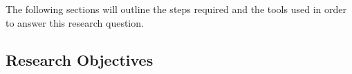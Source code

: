\documentclass[a4paper]{article}
\newcommand*{\0}{$\ket{0}$}
\newcommand*{\1}{$\ket{1}$}
\begin{document}

\flushleft
The following sections will outline the steps required and the tools used in order to answer this research question. 

\newpage
\subsection{Research Objectives}
\label{subsec:researchobjectives}


































\end{document}
